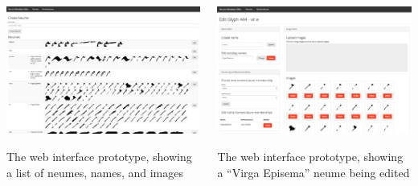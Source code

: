 \documentclass[final]{beamer}
\newlength{\onecolwid}
\newcommand{\blockSpace}{\vskip 0.75ex}
\begin{document}
\begin{frame}[fragile,t]
\begin{columns}
\begin{column}{\onecolwid}
\begin{block}{}
\centering
\includegraphics[width=\onecolwid]{images/neume-list-interface_cropped.png} 

The web interface prototype, showing a list of neumes, names, and images
\end{block}
\end{column}
\begin{column}{\onecolwid}
\begin{block}{}
\centering
\includegraphics[width=\onecolwid]{images/web-interface.png} 

The web interface prototype, showing a ``Virga Episema'' neume being edited
\end{block}

\end{column}
\end{columns}


\end{frame}
\end{document}
